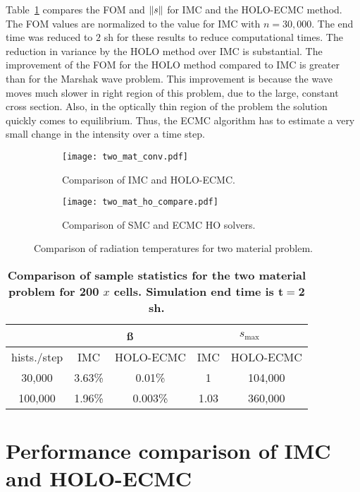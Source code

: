 Table~\ref{twomat_var} compares the FOM and $\ss$ for IMC and the HOLO-ECMC method.  The FOM
values are normalized to the value for IMC with $n=30,000$.  The end time was reduced
to $2$ sh for these results to reduce computational times. The reduction in variance by
the HOLO method over IMC is substantial. The improvement of the FOM for the HOLO
method compared to IMC is greater than for the
Marshak wave problem.  This improvement is because the wave moves much slower in
right region of this problem, due to
the large, constant cross section.  Also, in the optically thin
region of the problem the solution quickly comes to equilibrium.  Thus, the ECMC
algorithm has to estimate a very small change in the intensity over a time step.  
\begin{figure}[H]
    \centering
\begin{subfigure}{0.65\textwidth}
    \centering
    \texttt{[image: two\_mat\_conv.pdf]}
    \caption{Comparison of IMC and HOLO-ECMC.\label{twomat_full}}
\end{subfigure}    \begin{subfigure}{0.65\textwidth}
\centering
    \texttt{[image: two\_mat\_ho\_compare.pdf]}
    \caption{Comparison of SMC and ECMC HO solvers. \label{compare_ho}}
\end{subfigure}
    \caption{ Comparison of radiation temperatures for two material problem. \label{twomat}}
\end{figure}


\begin{table}[H]
\centering
\caption{\label{twomat_var} \textbf{Comparison of sample statistics for the
    two material problem for 200 $x$ cells.   Simulation end time is $\mathbf{t=2}$ sh.}}
\vspace{-0.1in}
\begin{tabular}{|c|cc|cc|}\cline{2-5}
    \multicolumn{1}{c|}{}       & \multicolumn{2}{|c|}{\ss} & \multicolumn{2}{|c|}{$s_{\max}$} \\ \hline
hists./step     & IMC & HOLO-ECMC  &  IMC & HOLO-ECMC   \\ \hline
   30,000	    & 3.63\%  & 0.01\% &  1      &   104,000      \\
  100,000       & 1.96\%  & 0.003\% & 1.03   &   360,000      \\ \hline
\end{tabular}
\end{table}

\section{Performance comparison of IMC and HOLO-ECMC}
\label{timing}

